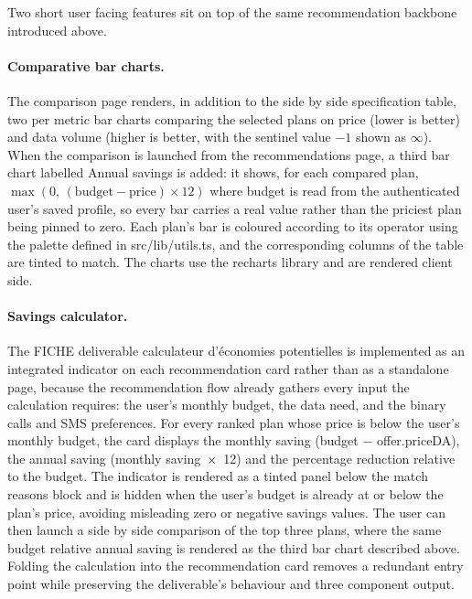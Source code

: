 Two short user facing features sit on top of the same recommendation backbone introduced above.

\paragraph{Comparative bar charts.} The comparison page renders, in addition to the side by side specification table, two per metric bar charts comparing the selected plans on price (lower is better) and data volume (higher is better, with the sentinel value $-1$ shown as \guillemotleft{}$\infty$\guillemotright{}). When the comparison is launched from the recommendations page, a third bar chart labelled \guillemotleft{}Annual savings\guillemotright{} is added: it shows, for each compared plan, $\max(0,\,(\mathrm{budget} - \mathrm{price}) \times 12)$ where budget is read from the authenticated user's saved profile, so every bar carries a real value rather than the priciest plan being pinned to zero. Each plan's bar is coloured according to its operator using the palette defined in src/lib/utils.ts, and the corresponding columns of the table are tinted to match. The charts use the recharts library and are rendered client side.

\paragraph{Savings calculator.} The FICHE deliverable \guillemotleft{}calculateur d'économies potentielles\guillemotright{} is implemented as an integrated indicator on each recommendation card rather than as a standalone page, because the recommendation flow already gathers every input the calculation requires: the user's monthly budget, the data need, and the binary calls and SMS preferences. For every ranked plan whose price is below the user's monthly budget, the card displays the monthly saving (budget $-$ offer.priceDA), the annual saving (monthly saving~$\times$~12) and the percentage reduction relative to the budget. The indicator is rendered as a tinted panel below the match reasons block and is hidden when the user's budget is already at or below the plan's price, avoiding misleading zero or negative savings values. The user can then launch a side by side comparison of the top three plans, where the same budget relative annual saving is rendered as the third bar chart described above. Folding the calculation into the recommendation card removes a redundant entry point while preserving the deliverable's behaviour and three component output.

